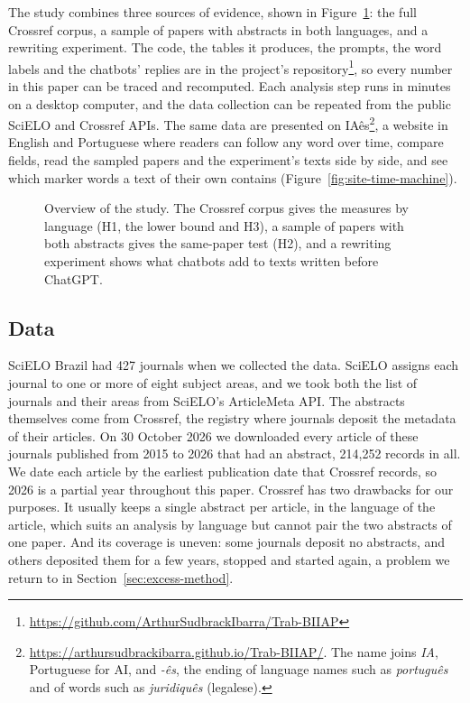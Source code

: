 \documentclass[12pt]{article}
\newcommand{\repo}{\url{https://github.com/ArthurSudbrackIbarra/Trab-BIIAP}}
\newcommand{\site}{\url{https://arthursudbrackibarra.github.io/Trab-BIIAP/}}
\begin{document}
The study combines three sources of evidence, shown in Figure~\ref{fig:pipeline}: the full Crossref
corpus, a sample of papers with abstracts in both languages, and a rewriting experiment. The code,
the tables it produces, the prompts, the word labels and the chatbots' replies are in the project's
repository\footnote{\repo}, so every number in this paper can be traced and recomputed. Each
analysis step runs in minutes on a desktop computer, and the data collection can be repeated from
the public SciELO and Crossref APIs. The same data are presented on IAês\footnote{\site. The name
joins \emph{IA}, Portuguese for AI, and \emph{-ês}, the ending of language names such as
\emph{português} and of words such as \emph{juridiquês} (legalese).}, a website in English and Portuguese where readers can follow any word over
time, compare fields, read the sampled papers and the experiment's texts side by side, and see
which marker words a text of their own contains (Figure~\ref{fig:site-time-machine}).

\begin{figure}[t]
  \centering
  
  \caption{Overview of the study. The Crossref corpus gives the measures by language (H1, the lower
    bound and H3), a sample of papers with both abstracts gives the same-paper test (H2), and a
    rewriting experiment shows what chatbots add to texts written before ChatGPT.}
  \label{fig:pipeline}
\end{figure}

\subsection{Data}
\label{sec:data}

SciELO Brazil had 427 journals when we collected the data. SciELO assigns each journal to one or
more of eight subject areas, and we took both the list of journals and their areas from SciELO's
ArticleMeta API. The abstracts themselves come from Crossref, the registry where journals deposit
the metadata of their articles. On 30 October 2026 we downloaded every article of these journals
published from 2015 to 2026 that had an abstract, 214,252 records in all. We date each article by
the earliest publication date that Crossref records, so 2026 is a partial year throughout this
paper. Crossref has two drawbacks for our purposes. It usually keeps a single abstract per article,
in the language of the article, which suits an analysis by language but cannot pair the two
abstracts of one paper. And its coverage is uneven: some journals deposit no abstracts, and others
deposited them for a few years, stopped and started again, a problem we return to in
Section~\ref{sec:excess-method}.
\end{document}
